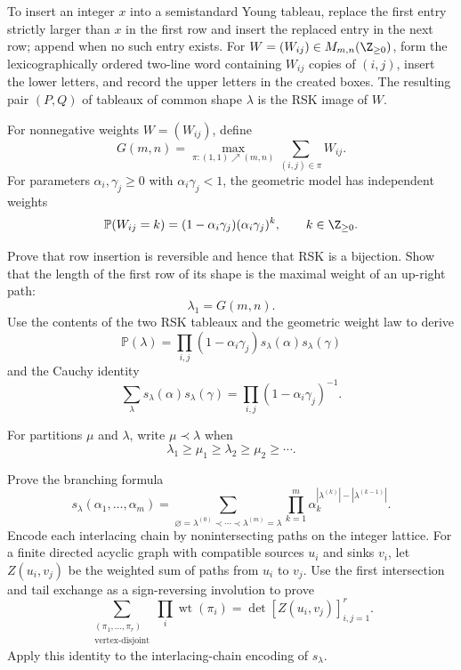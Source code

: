 \begin{exercise}
To insert an integer $x$ into a semistandard Young tableau, replace the
first entry
strictly larger than $x$ in the first row and insert the replaced entry in
the next row; append when no such entry exists.  For
$W=(W_{ij})\in M_{m,n}(\Z_{\geq0})$, form the lexicographically ordered
two-line word containing $W_{ij}$ copies of $(i,j)$, insert the lower
letters, and record the upper letters in the created boxes.  The resulting
pair $(P,Q)$ of tableaux of common shape $\lambda$ is the RSK image of
$W$.

For nonnegative weights $W=(W_{ij})$, define
\[
G(m,n)=\max_{\pi:(1,1)\nearrow(m,n)}
\sum_{(i,j)\in\pi}W_{ij}.
\]
For parameters $\alpha_i,\gamma_j\geq0$ with
$\alpha_i\gamma_j<1$, the geometric model has independent weights
\[
\mathbb P(W_{ij}=k)
=(1-\alpha_i\gamma_j)(\alpha_i\gamma_j)^k,
\qquad k\in\Z_{\geq0}.
\]

Prove that row insertion is reversible and hence that RSK is a bijection.
Show that the length of the first row of its shape is the maximal weight of
an up-right path:
\[
\lambda_1=G(m,n).
\]
Use the contents of the two RSK tableaux and the geometric weight law to
derive
\[
\mathbb P(\lambda)
=\prod_{i,j}(1-\alpha_i\gamma_j)
s_\lambda(\alpha)s_\lambda(\gamma)
\]
and the Cauchy identity
\[
\sum_\lambda s_\lambda(\alpha)s_\lambda(\gamma)
=\prod_{i,j}(1-\alpha_i\gamma_j)^{-1}.
\]
\end{exercise}

\begin{exercise}
For partitions $\mu$ and $\lambda$, write $\mu\prec\lambda$ when
\[
\lambda_1\geq\mu_1\geq\lambda_2\geq\mu_2\geq\cdots.
\]

Prove the branching formula
\[
s_\lambda(\alpha_1,\ldots,\alpha_m)
=\sum_{\varnothing=\lambda^{(0)}\prec\cdots\prec\lambda^{(m)}=\lambda}
\prod_{k=1}^m
\alpha_k^{|\lambda^{(k)}|-|\lambda^{(k-1)}|}.
\]
Encode each interlacing chain by nonintersecting paths on the integer lattice.
For a finite directed acyclic graph with compatible sources $u_i$ and sinks
$v_i$, let $Z(u_i,v_j)$ be the weighted sum of paths from $u_i$ to $v_j$.
Use the first intersection and tail exchange as a sign-reversing involution
to prove
\[
\sum_{\substack{(\pi_1,\ldots,\pi_r)\\
\text{vertex-disjoint}}}
\prod_i\operatorname{wt}(\pi_i)
=\det[Z(u_i,v_j)]_{i,j=1}^r.
\]
Apply this identity to the interlacing-chain encoding of $s_\lambda$.
\end{exercise}

